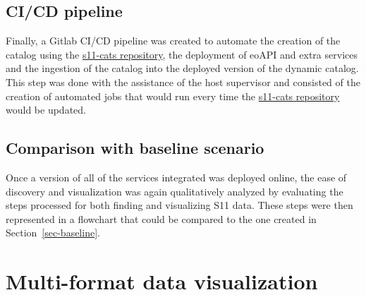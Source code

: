 \documentclass[
  oneside,
  open=any]{scrbook}
\begin{document}
\subsection{CI/CD pipeline}\label{cicd-pipeline}

Finally, a Gitlab CI/CD pipeline was created to automate the creation of
the catalog using the
\href{https://gitlab.com/satelligence/s11-cats}{s11-cats repository},
the deployment of eoAPI and extra services and the ingestion of the
catalog into the deployed version of the dynamic catalog. This step was
done with the assistance of the host supervisor and consisted of the
creation of automated jobs that would run every time the
\href{https://gitlab.com/satelligence/s11-cats}{s11-cats repository}
would be updated.

\subsection{Comparison with baseline
scenario}\label{comparison-with-baseline-scenario}

Once a version of all of the services integrated was deployed online,
the ease of discovery and visualization was again qualitatively analyzed
by evaluating the steps processed for both finding and visualizing S11
data. These steps were then represented in a flowchart that could be
compared to the one created in Section~\ref{sec-baseline}.

\section{Multi-format data
visualization}\label{multi-format-data-visualization}
\end{document}
